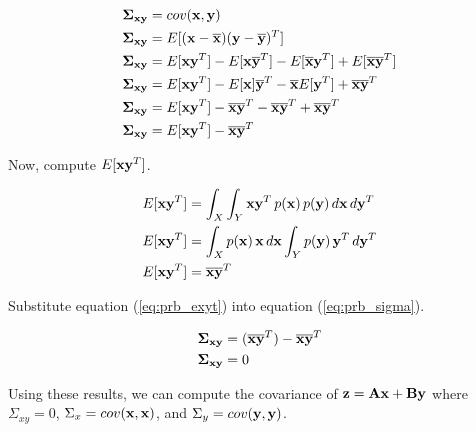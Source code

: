 \begin{align}
  \mathbf{\Sigma}_{\mathbf{x}\mathbf{y}} &= cov(\mathbf{x}, \mathbf{y}) \nonumber \\
  \mathbf{\Sigma}_{\mathbf{x}\mathbf{y}} &= E[(\mathbf{x} - \overline{\mathbf{x}})
    (\mathbf{y} - \overline{\mathbf{y}})^T] \nonumber \\
  \mathbf{\Sigma}_{\mathbf{x}\mathbf{y}} &= E[\mathbf{x}\mathbf{y}^T] -
    E[\mathbf{x}\overline{\mathbf{y}}^T] - E[\overline{\mathbf{x}}\mathbf{y}^T] +
    E[\overline{\mathbf{x}}\overline{\mathbf{y}}^T] \nonumber \\
  \mathbf{\Sigma}_{\mathbf{x}\mathbf{y}} &= E[\mathbf{x}\mathbf{y}^T] -
    E[\mathbf{x}]\overline{\mathbf{y}}^T - \overline{\mathbf{x}}E[\mathbf{y}^T] +
    \overline{\mathbf{x}}\overline{\mathbf{y}}^T \nonumber \\
  \mathbf{\Sigma}_{\mathbf{x}\mathbf{y}} &= E[\mathbf{x}\mathbf{y}^T] -
    \overline{\mathbf{x}}\overline{\mathbf{y}}^T - \overline{\mathbf{x}}\overline{\mathbf{y}}^T +
    \overline{\mathbf{x}}\overline{\mathbf{y}}^T \nonumber \\
  \mathbf{\Sigma}_{\mathbf{x}\mathbf{y}} &= E[\mathbf{x}\mathbf{y}^T] -
    \overline{\mathbf{x}}\overline{\mathbf{y}}^T \label{eq:prb_sigma}
\end{align}

Now, compute $E[\mathbf{x}\mathbf{y}^T]$.

\begin{align}
  E[\mathbf{x}\mathbf{y}^T] &= \int_X \int_Y \mathbf{x}\mathbf{y}^T \,p(\mathbf{x})
    \,p(\mathbf{y}) \,d\mathbf{x} \,d\mathbf{y}^T \nonumber \\
  E[\mathbf{x}\mathbf{y}^T] &= \int_X p(\mathbf{x}) \,\mathbf{x} \,d\mathbf{x}
    \int_Y p(\mathbf{y}) \,\mathbf{y}^T \,d\mathbf{y}^T \nonumber \\
  E[\mathbf{x}\mathbf{y}^T] &= \overline{\mathbf{x}}\overline{\mathbf{y}}^T \label{eq:prb_exyt}
\end{align}

Substitute equation (\ref{eq:prb_exyt}) into equation (\ref{eq:prb_sigma}).

\begin{align*}
  \mathbf{\Sigma}_{\mathbf{x}\mathbf{y}} &= (\overline{\mathbf{x}}\overline{\mathbf{y}}^T) -
    \overline{\mathbf{x}}\overline{\mathbf{y}}^T \\
  \mathbf{\Sigma}_{\mathbf{x}\mathbf{y}} &= 0
\end{align*}

Using these results, we can compute the covariance of
$\mathbf{z} = \mathbf{A}\mathbf{x} + \mathbf{B}\mathbf{y}$ where $\Sigma_{xy} = 0$,
$\Sigma_x = cov(\mathbf{x}, \mathbf{x})$, and $\Sigma_y = cov(\mathbf{y}, \mathbf{y})$.


